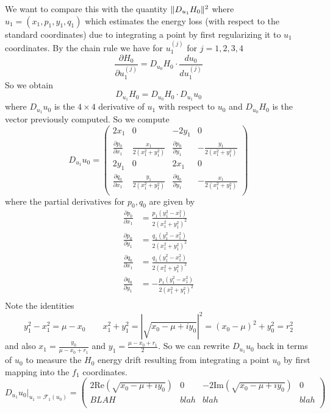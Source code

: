 \documentclass[10pt]{article}
\newcommand{\cF}{\mathcal{F}}
\newcommand{\pardiff}[2]{\frac{\partial #1}{\partial #2}}
\newcommand{\abs}[1]{\left| #1 \right|}
\DeclarePairedDelimiter{\norm}{\lVert}{\rVert}
\renewcommand{\Re}{\text{Re}}
\renewcommand{\Im}{\text{Im}}
\theoremstyle{definition}
\theoremstyle{remark}
\begin{document}
We want to compare this with the quantity $\norm {D_{u_1} H_0}^2$ where $u_1 = (x_1, p_1, y_1, q_1)$ which estimates the energy loss (with respect to the standard coordinates) due to integrating a point by first regularizing it to $u_1$ coordinates. By the chain rule we have for $u_1^{(j)}$ for $j = 1,2,3,4$
\[
\pardiff{H_0}{u_1^{(j)}} = D_{u_0} H_0 \cdot \frac{d u_0}{du_1^{(j)}}
\]
So we obtain
\[
D_{u_1} H_0 = D_{u_0} H_0 \cdot D_{u_1} u_0
\] 
where $D_{u_1} u_0$ is the $4 \times 4$ derivative of $u_1$ with respect to $u_0$ and $D_{u_0} H_0$ is the vector previously computed. So we compute
\[
D_{u_1} u_0 = 
\begin{pmatrix}
2 x_1 & 0 & -2 y_1 & 0 \\
\pardiff{p_0}{x_1} & \frac{x_1}{2(x_1^2 + y_1^2)} & \pardiff{p_0}{y_1} & - \frac{y_1}{2(x_1^2 + y_1^2)} \\
2 y_1 & 0 & 2 x_1 & 0 \\
\pardiff{q_0}{x_1} & \frac{y_1}{2(x_1^2 + y_1^2)} & \pardiff{q_0}{y_1} & - \frac{x_1}{2(x_1^2 + y_1^2)} \\
\end{pmatrix}
\]
where the partial derivatives for $p_0,q_0$ are given by 
\begin{align*}
	\pardiff{p_0}{x_1} & =  \frac{p_1 (y_1^2 - x_1^2)}{2 (x_1^2 + y_1^2)^2} \\
	\pardiff{p_0}{y_1} & =  \frac{q_1 (y_1^2 - x_1^2)}{2 (x_1^2 + y_1^2)^2} \\
	\pardiff{q_0}{x_1} & =  \frac{q_1 (y_1^2 - x_1^2)}{2 (x_1^2 + y_1^2)^2} \\
	\pardiff{q_0}{y_1} & =  -\frac{p_1 (y_1^2 - x_1^2)}{2 (x_1^2 + y_1^2)^2} \\
\end{align*}
Note the identities
\[y_1^2 - x_1^2 = \mu - x_0 \qquad x_1^2 + y_1^2 = \abs{\sqrt{x_0 - \mu + i y_0}}^2 = (x_0 - \mu)^2 + y_0^2 = r_2^2
\]
and also $x_1 = \frac{y_0}{\mu - x_0 + r_1}$ and $y_1 = \frac{\mu - x_0 + r_1}{2}$.
So we can rewrite $D_{u_1} u_0$ back in terms of $u_0$ to measure the $H_0$ energy drift resulting from integrating a point $u_0$ by first mapping into the $f_1$ coordinates. 
\[
D_{u_1} u_0 \bigg|_{u_1 = \cF_1(u_0)} = 
\begin{pmatrix}
2 \Re(\sqrt{x_0 - \mu + i y_0}) & 0 & -2 \Im(\sqrt{x_0 - \mu + i y_0}) & 0 \\
BLAH & blah & blah & blah \\
\end{pmatrix}
\]
\end{document}
